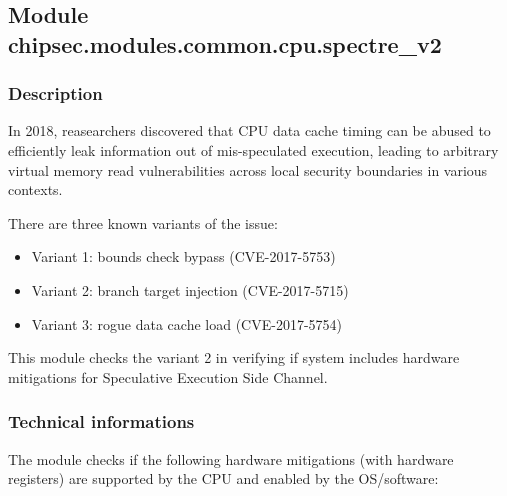 \hypertarget{module-chipsec.modules.common.cpu.spectre_v2}{%
\subsection{Module
chipsec.modules.common.cpu.spectre\_v2}\label{module-chipsec.modules.common.cpu.spectre_v2}}

\hypertarget{description-17}{%
\subsubsection{Description}\label{description-17}}

In 2018, reasearchers discovered that CPU data cache timing can be
abused to efficiently leak information out of mis-speculated execution,
leading to arbitrary virtual memory read vulnerabilities across local
security boundaries in various contexts.

There are three known variants of the issue:

\begin{itemize}
\tightlist
\item
  Variant 1: bounds check bypass (CVE-2017-5753)
\item
  Variant 2: branch target injection (CVE-2017-5715)
\item
  Variant 3: rogue data cache load (CVE-2017-5754)
\end{itemize}

This module checks the variant 2 in verifying if system includes
hardware mitigations for Speculative Execution Side Channel.

\hypertarget{technical-informations-16}{%
\subsubsection{Technical informations}\label{technical-informations-16}}

The module checks if the following hardware mitigations (with hardware
registers) are supported by the CPU and enabled by the OS/software:

